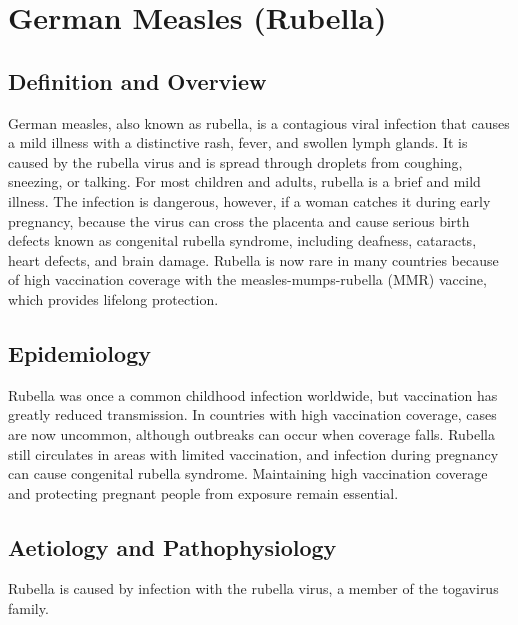 \chapter{German Measles (Rubella)}

\section*{Definition and Overview}
German measles, also known as rubella, is a contagious viral infection that causes a mild illness with a distinctive rash, fever, and swollen lymph glands. It is caused by the rubella virus and is spread through droplets from coughing, sneezing, or talking. For most children and adults, rubella is a brief and mild illness. The infection is dangerous, however, if a woman catches it during early pregnancy, because the virus can cross the placenta and cause serious birth defects known as congenital rubella syndrome, including deafness, cataracts, heart defects, and brain damage. Rubella is now rare in many countries because of high vaccination coverage with the measles-mumps-rubella (MMR) vaccine, which provides lifelong protection.

\section*{Epidemiology}
Rubella was once a common childhood infection worldwide, but vaccination has greatly reduced transmission. In countries with high vaccination coverage, cases are now uncommon, although outbreaks can occur when coverage falls. Rubella still circulates in areas with limited vaccination, and infection during pregnancy can cause congenital rubella syndrome. Maintaining high vaccination coverage and protecting pregnant people from exposure remain essential.

\section*{Aetiology and Pathophysiology}
Rubella is caused by infection with the rubella virus, a member of the togavirus family.

